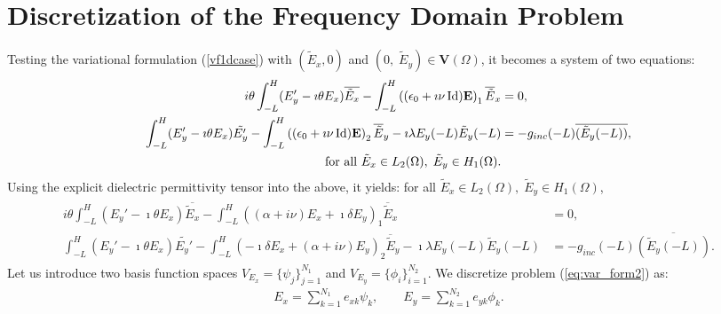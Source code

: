 \section{Discretization of the Frequency Domain Problem}
\label{sec:discr}
Testing the variational formulation (\ref{vf1dcase}) with $(\tilde E_x,0)$ and $(0,\; \tilde{E}_y)\in\mathbf{V}(\Omega)$, it becomes a system of two equations:
\begin{align*}
\begin{split}
i\theta \displaystyle \int_{-L}^H (E_y' -\imath\theta E_x)\overline{\tilde E_x} - \int_{-L}^H \left((\epsilon_0 +\imath\nu \operatorname{Id}) {\bf E}\right)_{1} \overline{\tilde E}_{x}
&=0,\\
\displaystyle \int_{-L}^H (E_y' -\imath\theta E_x)\tilde {E_y'} - \int_{-L}^H\left( (\epsilon_0 +\imath\nu\operatorname{Id}) {\bf E}\right)_{2}\overline{\tilde{E}}_{y}
  - \imath \lambda E_y (-L) \tilde E_y (-L) &= -g_{inc} (-L) \overline{( \tilde E_y(-L) )},\\
  \text{ for all } \tilde E_x\in L_{2}(\Omega), \; \tilde{E}_{y}\in H_{1}(\Omega).
  \end{split}
\end{align*}
Using the explicit  dielectric permittivity tensor into the above, it yields: for all $ \tilde E_x\in L_{2}(\Omega), \; \tilde{E}_{y}\in H_{1}(\Omega)$,
\begin{align}
\label{eq:var_form2}
\begin{split}
 i\theta \displaystyle \int_{-L}^H (E_y' -\imath\theta E_x)\overline{\tilde E_x} - 
 \int_{-L}^H \left((\alpha+i\nu)E_x+\imath\delta E_y\right)_{1} \overline{\tilde E}_{x}
&=0,\\
\int_{-L}^H (E_y' -\imath\theta E_x)\tilde {E_y'} -
\int_{-L}^H\left( -\imath \delta E_x+(\alpha+i\nu) E_y\right)_{2}\overline{\tilde{E}}_{y}
  - \imath \lambda E_y (-L) \tilde E_y (-L) &= -g_{inc} (-L) \overline{( \tilde E_y(-L) )}.
  \end{split}
\end{align}
Let us introduce two basis function spaces $V_{E_x}=\{\psi_{j}\}_{j=1}^{N_{1}}$ and $V_{E_{y}}=\{\phi_{i}\}_{i=1}^{N_{2}}$. 
We discretize problem (\ref{eq:var_form2}) as:
\begin{align*}
E_x=\sum\limits_{k=1}^{N_{1}}e_{xk}\psi_{k},\qquad E_{y}=\sum\limits_{k=1}^{N_{2}}e_{yk}\phi_{k}.
\end{align*}

